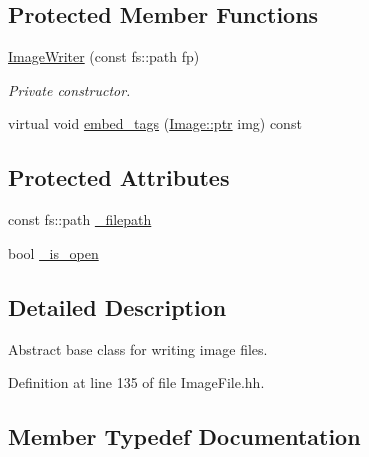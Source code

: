 \subsection*{Protected Member Functions}
\begin{DoxyCompactItemize}
\item 
\hyperlink{class_photo_finish_1_1_image_writer_aa20f3f269819030b312ffd2a48591bb0}{Image\+Writer} (const fs\+::path fp)
\begin{DoxyCompactList}\small\item\em Private constructor. \end{DoxyCompactList}\item 
virtual void \hyperlink{class_photo_finish_1_1_image_writer_ab53f665863c877fc5066eb3227a06294}{embed\+\_\+tags} (\hyperlink{class_photo_finish_1_1_image_ab336203305ed3a1397d7245063353b5a}{Image\+::ptr} img) const
\end{DoxyCompactItemize}
\subsection*{Protected Attributes}
\begin{DoxyCompactItemize}
\item 
const fs\+::path \hyperlink{class_photo_finish_1_1_image_writer_ad756db40f06cc2d53ee8f91cf5999bd2}{\+\_\+filepath}
\item 
bool \hyperlink{class_photo_finish_1_1_image_writer_a5ccd6aefd5f71b9e204e2b4094d10d4f}{\+\_\+is\+\_\+open}
\end{DoxyCompactItemize}


\subsection{Detailed Description}
Abstract base class for writing image files. 

Definition at line 135 of file Image\+File.\+hh.



\subsection{Member Typedef Documentation}
\mbox{\label{class_photo_finish_1_1_image_writer_ad09511cf9f26b7cec2ca0fb6ae361aac}} 
